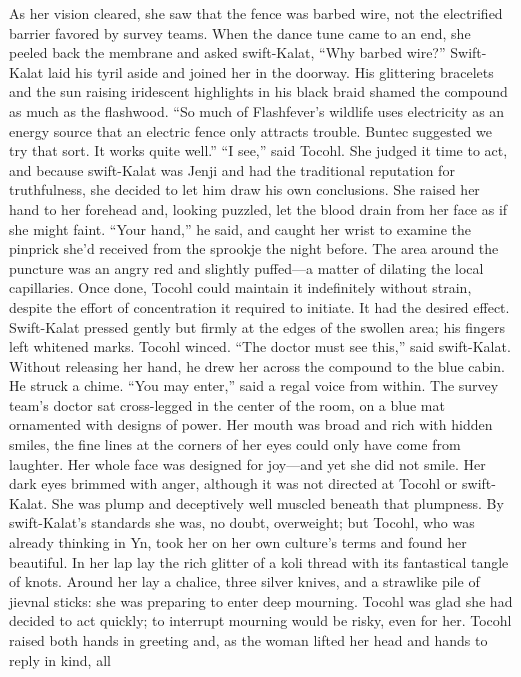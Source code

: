 \documentclass[9pt]{article}
\begin{document}
As her vision cleared, she saw that the fence was barbed wire, not the electrified barrier favored by
survey teams. When the dance tune came to an end, she peeled back the membrane and asked
swift-Kalat, “Why barbed wire?”
Swift-Kalat laid his tyril aside and joined her in the doorway. His glittering bracelets and the sun
raising iridescent highlights in his black braid shamed the compound as much as the flashwood.
“So much of Flashfever’s wildlife uses electricity as an energy source that an electric fence only
attracts trouble. Buntec suggested we try that sort. It works quite well.”
“I see,” said Tocohl.
She judged it time to act, and because swift-Kalat was Jenji and had the traditional reputation for
truthfulness, she decided to let him draw his own conclusions. She raised her hand to her forehead and,
looking puzzled, let the blood drain from her face as if she might faint.
“Your hand,” he said, and caught her wrist to examine the pinprick she’d received from the sprookje
the night before.
The area around the puncture was an angry red and slightly puffed—a matter of dilating the local
capillaries. Once done, Tocohl could maintain it indefinitely without strain, despite the effort of
concentration it required to initiate.
It had the desired effect. Swift-Kalat pressed gently but firmly at the edges of the swollen area; his
fingers left whitened marks. Tocohl winced. “The doctor must see this,” said swift-Kalat. Without
releasing her hand, he drew her across the compound to the blue cabin. He struck a chime.
“You may enter,” said a regal voice from within.
The survey team’s doctor sat cross-legged in the center of the room, on a blue mat ornamented with
designs of power. Her mouth was broad and rich with hidden smiles, the fine lines at the corners of her
eyes could only have come from laughter. Her whole face was designed for joy—and yet she did not
smile. Her dark eyes brimmed with anger, although it was not directed at Tocohl or swift-Kalat.
She was plump and deceptively well muscled beneath that plumpness. By swift-Kalat’s standards
she was, no doubt, overweight; but Tocohl, who was already thinking in Yn, took her on her own
culture’s terms and found her beautiful.
In her lap lay the rich glitter of a koli thread with its fantastical tangle of knots. Around her lay a
chalice, three silver knives, and a strawlike pile of jievnal sticks: she was preparing to enter deep
mourning. Tocohl was glad she had decided to act quickly; to interrupt mourning would be risky, even
for her.
Tocohl raised both hands in greeting and, as the woman lifted her head and hands to reply in kind, all
\end{document}
